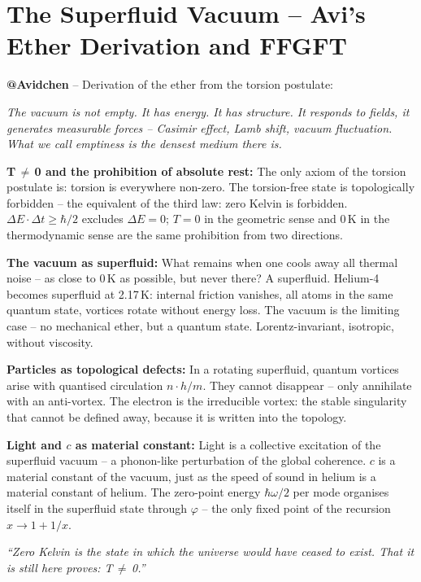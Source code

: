 \section{The Superfluid Vacuum -- Avi's Ether Derivation and FFGFT}

\begin{avipost}
\textbf{@Avidchen} -- Derivation of the ether from the torsion postulate:

\medskip
\textit{The vacuum is not empty. It has energy. It has structure. It responds to fields, it generates measurable forces -- Casimir effect, Lamb shift, vacuum fluctuation. What we call emptiness is the densest medium there is.}

\medskip
\textbf{T\,$\neq$\,0 and the prohibition of absolute rest:} The only axiom of the torsion postulate is: torsion is everywhere non-zero. The torsion-free state is topologically forbidden -- the equivalent of the third law: zero Kelvin is forbidden. $\Delta E \cdot \Delta t \geq \hbar/2$ excludes $\Delta E = 0$; $T=0$ in the geometric sense and 0\,K in the thermodynamic sense are the same prohibition from two directions.

\medskip
\textbf{The vacuum as superfluid:} What remains when one cools away all thermal noise -- as close to 0\,K as possible, but never there? A superfluid. Helium-4 becomes superfluid at 2.17\,K: internal friction vanishes, all atoms in the same quantum state, vortices rotate without energy loss. The vacuum is the limiting case -- no mechanical ether, but a quantum state. Lorentz-invariant, isotropic, without viscosity.

\medskip
\textbf{Particles as topological defects:} In a rotating superfluid, quantum vortices arise with quantised circulation $n \cdot h/m$. They cannot disappear -- only annihilate with an anti-vortex. The electron is the irreducible vortex: the stable singularity that cannot be defined away, because it is written into the topology.

\medskip
\textbf{Light and $c$ as material constant:} Light is a collective excitation of the superfluid vacuum -- a phonon-like perturbation of the global coherence. $c$ is a material constant of the vacuum, just as the speed of sound in helium is a material constant of helium. The zero-point energy $\hbar\omega/2$ per mode organises itself in the superfluid state through $\varphi$ -- the only fixed point of the recursion $x \to 1 + 1/x$.

\medskip
\textit{``Zero Kelvin is the state in which the universe would have ceased to exist. That it is still here proves: T\,$\neq$\,0.''}
\end{avipost}

